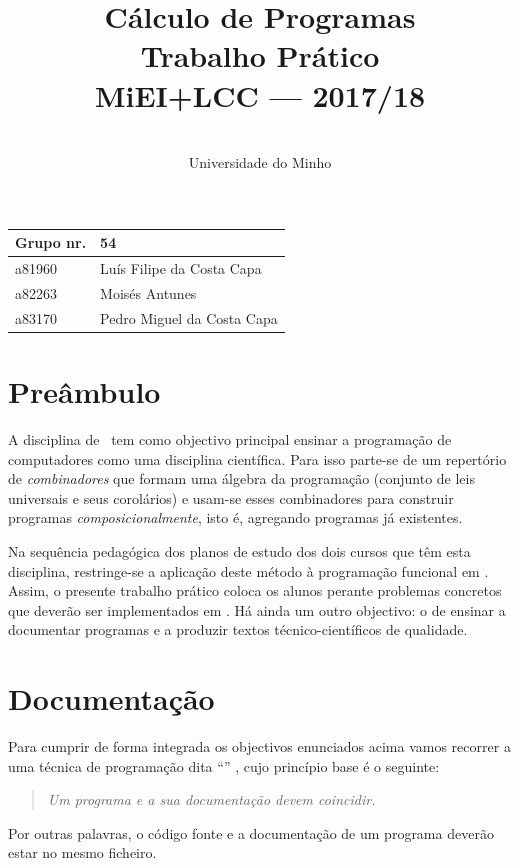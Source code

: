 \documentclass[a4paper]{article}
\title{
       	    Cálculo de Programas
\\
       	Trabalho Prático
\\
       	MiEI+LCC --- 2017/18
}
\author{
       	\dium
\\
       	Universidade do Minho
}
\date\mydate
\begin{document}
\maketitle

\begin{center}\large
\begin{tabular}{ll}
\textbf{Grupo} nr. & 54
\\\hline
a81960 & Luís Filipe da Costa Capa
\\
a82263 & Moisés Antunes
\\
a83170 & Pedro Miguel da Costa Capa
\end{tabular}
\end{center}

\section{Preâmbulo}

A disciplina de \CP\ tem como objectivo principal ensinar
a progra\-mação de computadores como uma disciplina científica. Para isso
parte-se de um repertório de \emph{combinadores} que formam uma álgebra da
programação (conjunto de leis universais e seus corolários) e usam-se esses
combinadores para construir programas \emph{composicionalmente}, isto é,
agregando programas já existentes.
  
Na sequência pedagógica dos planos de estudo dos dois cursos que têm esta
disciplina, restringe-se a aplicação deste método à programação funcional
em \Haskell. Assim, 
o presente trabalho prático coloca os alunos perante problemas
concretos que deverão ser implementados em \Haskell.
Há ainda um outro objectivo: o de ensinar a documentar programas e
a produzir textos técnico-científicos de qualidade.

\section{Documentação}
Para cumprir de forma integrada os objectivos enunciados acima vamos recorrer
a uma técnica de programa\-ção dita ``'' \cite{Kn92}, cujo
princípio base é o seguinte:
\begin{quote}\em
Um programa e a sua documentação devem coincidir.
\end{quote}
Por outras palavras, o código fonte e a documentação de um programa deverão estar no
mesmo ficheiro.
\end{document}
